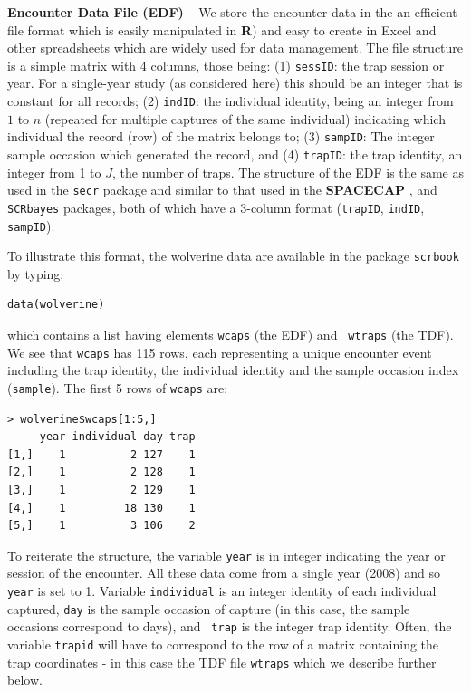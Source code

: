 {\flushleft \bf Encounter Data File (EDF)} --
We store the encounter data in the
an efficient file format which is easily manipulated in {\bf R}) and
easy to create in  Excel and other spreadsheets which are widely used
for data management.
The file
structure is a simple matrix with 4 columns, those being: (1)
\mbox{\tt sessID}: the trap
session or year. %
For a single-year study (as considered here) this
should be an integer  that is constant for all records; (2) \mbox{\tt indID}: the
individual identity, being an integer from $1$ to $n$ (repeated for
multiple captures of the same individual) indicating which
individual the record (row) of the matrix belongs to; (3) \mbox{\tt sampID}: The integer sample
occasion which generated the record, and (4) \mbox{\tt trapID}: the
trap identity, an
integer from 1 to $J$, the number of traps.  The structure of the EDF
is the same as used in the \mbox{\tt secr} package \citep{efford:2011}
and similar to that used
in the {\bf SPACECAP} \citep{gopalaswamy_etal:2012mee}, and
\mbox{\tt SCRbayes} \citep{russell_etal:2012} packages, both of which
have a 3-column format (\mbox{\tt trapID}, \mbox{\tt indID}, \mbox{\tt
  sampID}).

To illustrate this format, the wolverine data are available in the
package \mbox{\tt scrbook} by typing:
\begin{verbatim}
data(wolverine)
\end{verbatim}
which contains a list having elements \mbox{\tt wcaps} (the EDF) and \mbox{\tt
  wtraps} (the TDF).
We see that  \mbox{\tt wcaps} has
 115 rows, each representing a unique encounter event including the
trap identity, the individual identity and the sample occasion index
(\mbox{\tt sample}).  The first 5 rows of \mbox{\tt wcaps} are:
{\small
\begin{verbatim}
> wolverine$wcaps[1:5,]
     year individual day trap
[1,]    1          2 127    1
[2,]    1          2 128    1
[3,]    1          2 129    1
[4,]    1         18 130    1
[5,]    1          3 106    2
\end{verbatim}
}
To reiterate the structure, the variable \mbox{\tt year} is in
integer indicating the year or session of the encounter. All these
data come from a single year (2008) and so \mbox{\tt year} is set to
1. Variable \mbox{\tt individual} is an integer identity of each
individual captured, \mbox{\tt day} is the sample occasion of capture
(in this case, the sample occasions correspond to days), and \mbox{\tt
  trap} is the integer trap identity.
Often, the variable \mbox{\tt trapid} will have to
correspond to the row of a matrix containing the trap coordinates - in
this case the TDF file \mbox{\tt wtraps} which we describe further below.

